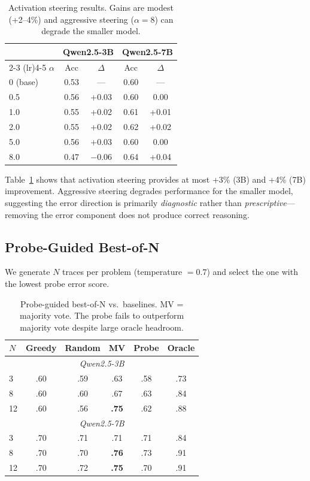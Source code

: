 \documentclass[11pt]{article}
\newcommand{\modelsmall}{Qwen2.5-3B}
\newcommand{\modelmed}{Qwen2.5-7B}
\begin{document}
\begin{table}[t]
\centering
\small
\begin{tabular}{lcccc}
\toprule
& \multicolumn{2}{c}{\textbf{\modelsmall}} & \multicolumn{2}{c}{\textbf{\modelmed}} \\
\cmidrule(lr){2-3} \cmidrule(lr){4-5}
$\alpha$ & Acc & $\Delta$ & Acc & $\Delta$ \\
\midrule
0 (base) & 0.53 & --- & 0.60 & --- \\
0.5 & 0.56 & +0.03 & 0.60 & 0.00 \\
1.0 & 0.55 & +0.02 & 0.61 & +0.01 \\
2.0 & 0.55 & +0.02 & 0.62 & +0.02 \\
5.0 & 0.56 & +0.03 & 0.60 & 0.00 \\
8.0 & 0.47 & $-$0.06 & 0.64 & +0.04 \\
\bottomrule
\end{tabular}
\caption{Activation steering results. Gains are modest (+2--4\%) and aggressive steering ($\alpha=8$) can degrade the smaller model.}
\label{tab:steering}
\end{table}

Table~\ref{tab:steering} shows that activation steering provides at most +3\% (3B) and +4\% (7B) improvement.
Aggressive steering degrades performance for the smaller model, suggesting the error direction is primarily \textit{diagnostic} rather than \textit{prescriptive}---removing the error component does not produce correct reasoning.

\subsection{Probe-Guided Best-of-N}

We generate $N$ traces per problem (temperature $= 0.7$) and select the one with the lowest probe error score.

\begin{table}[t]
\centering
\small
\begin{tabular}{lccccc}
\toprule
$N$ & Greedy & Random & MV & Probe & Oracle \\
\midrule
\multicolumn{6}{c}{\textit{\modelsmall}} \\
3 & .60 & .59 & .63 & .58 & .73 \\
8 & .60 & .60 & .67 & .63 & .84 \\
12 & .60 & .56 & \textbf{.75} & .62 & .88 \\
\midrule
\multicolumn{6}{c}{\textit{\modelmed}} \\
3 & .70 & .71 & .71 & .71 & .84 \\
8 & .70 & .70 & \textbf{.76} & .73 & .91 \\
12 & .70 & .72 & \textbf{.75} & .70 & .91 \\
\bottomrule
\end{tabular}
\caption{Probe-guided best-of-N vs.\ baselines. MV = majority vote. The probe fails to outperform majority vote despite large oracle headroom.}
\label{tab:bon}
\end{table}
\end{document}
